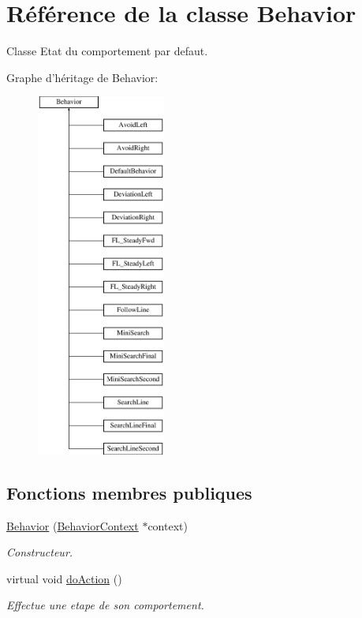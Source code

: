 \hypertarget{class_behavior}{\section{Référence de la classe Behavior}
\label{class_behavior}
}


Classe Etat du comportement par defaut.  


Graphe d'héritage de Behavior\-:\begin{figure}[H]
\begin{center}
\leavevmode
\includegraphics[height=12.000000cm]{class_behavior}
\end{center}
\end{figure}
\subsection*{Fonctions membres publiques}
\begin{DoxyCompactItemize}
\item 
\hypertarget{class_behavior_a335dc833288c48573797fa8eff3d04d5}{\hyperlink{class_behavior_a335dc833288c48573797fa8eff3d04d5}{Behavior} (\hyperlink{class_behavior_context}{Behavior\-Context} $\ast$context)}\label{class_behavior_a335dc833288c48573797fa8eff3d04d5}

\begin{DoxyCompactList}\small\item\em Constructeur. \end{DoxyCompactList}\end{DoxyCompactItemize}
{\bf }\par
\begin{DoxyCompactItemize}
\item 
virtual void \hyperlink{group__inf2990_gac22f205bc85075ff707ad1f695c18439}{do\-Action} ()
\begin{DoxyCompactList}\small\item\em Effectue une etape de son comportement. \end{DoxyCompactList}\end{DoxyCompactItemize}

